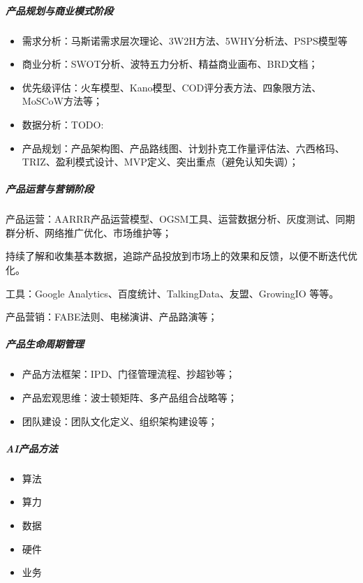\documentclass[letterpaper,11pt,english]{sphinxmanual}
\begin{document}
\subparagraph{产品规划与商业模式阶段}
\label{\detokenize{chapter_introduction/ability:id12}}\begin{itemize}
\item {} 
需求分析：马斯诺需求层次理论、3W2H方法、5WHY分析法、PSPS模型等

\item {} 
商业分析：SWOT分析、波特五力分析、精益商业画布、BRD文档；

\item {} 
优先级评估：火车模型、Kano模型、COD评分表方法、四象限方法、MoSCoW方法等；

\item {} 
数据分析：TODO:

\item {} 
产品规划：产品架构图、产品路线图、计划扑克工作量评估法、六西格玛、TRIZ、盈利模式设计、MVP定义、突出重点（避免认知失调）；

\end{itemize}


\subparagraph{产品运营与营销阶段}
\label{\detokenize{chapter_introduction/ability:id13}}
产品运营：AARRR产品运营模型、OGSM工具、运营数据分析、灰度测试、同期群分析、网络推广优化、市场维护等；

持续了解和收集基本数据，追踪产品投放到市场上的效果和反馈，以便不断迭代优化。
%
\begin{footnote}[299]\sphinxAtStartFootnote
{}
%
\end{footnote} 工具：Google
Analytics、百度统计、TalkingData、友盟、GrowingIO 等等。

产品营销：FABE法则、电梯演讲、产品路演等；


\subparagraph{产品生命周期管理}
\label{\detokenize{chapter_introduction/ability:id14}}\begin{itemize}
\item {} 
产品方法框架：IPD、门径管理流程、抄超钞等；

\item {} 
产品宏观思维：波士顿矩阵、多产品组合战略等；

\item {} 
团队建设：团队文化定义、组织架构建设等；

\end{itemize}


\subparagraph{AI产品方法}
\label{\detokenize{chapter_introduction/ability:ai}}\begin{itemize}
\item {} 
算法

\item {} 
算力

\item {} 
数据

\item {} 
硬件

\item {} 
业务

\end{itemize}
\end{document}

